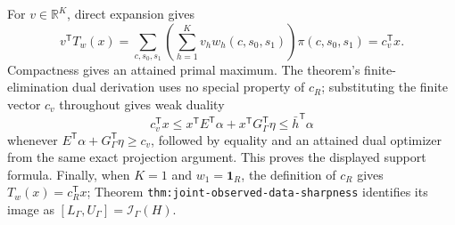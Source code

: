 For \(v\in\mathbb R^K\), direct expansion gives
\[
v^{\mathsf T}T_w(x)
=\sum_{c,s_0,s_1}\left(\sum_{h=1}^{K}v_hw_h(c,s_0,s_1)\right)
\pi(c,s_0,s_1)
=c_v^{\mathsf T}x.
\]
Compactness gives an attained primal maximum.  The theorem's finite-elimination dual derivation uses no special property of \(c_R\); substituting the finite vector \(c_v\) throughout gives weak duality
\[
c_v^{\mathsf T}x
\leq x^{\mathsf T}E^{\mathsf T}\alpha+x^{\mathsf T}G_{\Gamma}^{\mathsf T}\eta
\leq\bar h^{\mathsf T}\alpha
\]
whenever \(E^{\mathsf T}\alpha+G_{\Gamma}^{\mathsf T}\eta\geq c_v\), followed by equality and an attained dual optimizer from the same exact projection argument.  This proves the displayed support formula.  Finally, when \(K=1\) and \(w_1=\mathbf 1_R\), the definition of \(c_R\) gives \(T_w(x)=c_R^{\mathsf T}x\); Theorem \texttt{thm:joint-observed-data-sharpness} identifies its image as \([L_{\Gamma},U_{\Gamma}]=\mathcal I_{\Gamma}(H)\).
